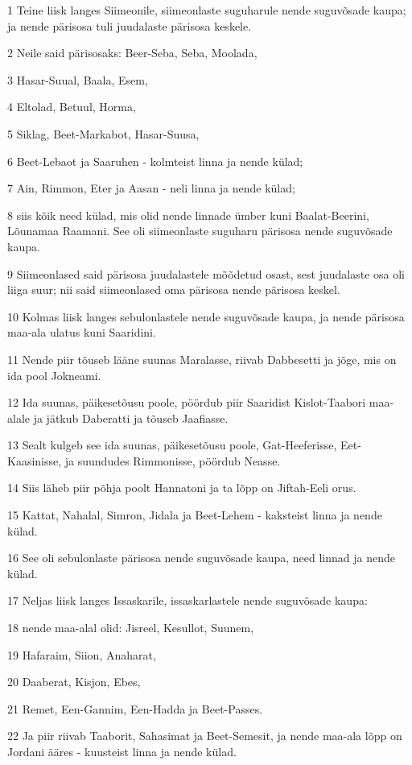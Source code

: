 \par 1 Teine liisk langes Siimeonile, siimeonlaste suguharule nende suguvõsade kaupa; ja nende pärisosa tuli juudalaste pärisosa keskele.
\par 2 Neile said pärisosaks: Beer-Seba, Seba, Moolada,
\par 3 Hasar-Suual, Baala, Esem,
\par 4 Eltolad, Betuul, Horma,
\par 5 Siklag, Beet-Markabot, Hasar-Suusa,
\par 6 Beet-Lebaot ja Saaruhen - kolmteist linna ja nende külad;
\par 7 Ain, Rimmon, Eter ja Aasan - neli linna ja nende külad;
\par 8 siis kõik need külad, mis olid nende linnade ümber kuni Baalat-Beerini, Lõunamaa Raamani. See oli siimeonlaste suguharu pärisosa nende suguvõsade kaupa.
\par 9 Siimeonlased said pärisosa juudalastele mõõdetud osast, sest juudalaste osa oli liiga suur; nii said siimeonlased oma pärisosa nende pärisosa keskel.
\par 10 Kolmas liisk langes sebulonlastele nende suguvõsade kaupa, ja nende pärisosa maa-ala ulatus kuni Saaridini.
\par 11 Nende piir tõuseb lääne suunas Maralasse, riivab Dabbesetti ja jõge, mis on ida pool Jokneami.
\par 12 Ida suunas, päikesetõusu poole, pöördub piir Saaridist Kislot-Taabori maa-alale ja jätkub Daberatti ja tõuseb Jaafiasse.
\par 13 Sealt kulgeb see ida suunas, päikesetõusu poole, Gat-Heeferisse, Eet-Kaasinisse, ja suundudes Rimmonisse, pöördub Neasse.
\par 14 Siis läheb piir põhja poolt Hannatoni ja ta lõpp on Jiftah-Eeli orus.
\par 15 Kattat, Nahalal, Simron, Jidala ja Beet-Lehem - kaksteist linna ja nende külad.
\par 16 See oli sebulonlaste pärisosa nende suguvõsade kaupa, need linnad ja nende külad.
\par 17 Neljas liisk langes Issaskarile, issaskarlastele nende suguvõsade kaupa:
\par 18 nende maa-alal olid: Jisreel, Kesullot, Suunem,
\par 19 Hafaraim, Siion, Anaharat,
\par 20 Daaberat, Kisjon, Ebes,
\par 21 Remet, Een-Gannim, Een-Hadda ja Beet-Passes.
\par 22 Ja piir riivab Taaborit, Sahasimat ja Beet-Semesit, ja nende maa-ala lõpp on Jordani ääres - kuusteist linna ja nende külad.
